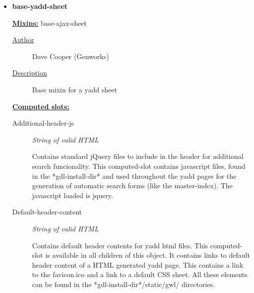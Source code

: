 \documentclass [11pt]{book}
\begin{document}
\begin{itemize}
\begin{description}
\end{description}







\item {}
\label{prim:base-yadd-sheet}
\textbf{base-yadd-sheet}


\textbf{
\underline{Mixins:}} base-ajax-sheet





\begin{description}

\item [
\underline{Author}]


Dave Cooper (Genworks)



\item [
\underline{Description}]


Base mixin for a yadd sheet



\end{description}








\textbf{
\underline{Computed slots:}}

\begin{description}

\item [Additional-header-js]
\emph{String of valid HTML}

 Contains standard jQuery files to include
in the header for additional search funcionality.  This computed-slot
contains javascript files, found in the *gdl-install-dir* and used
throughout the yadd pages for the generation of automatic search
forms (like the master-index).  The javascript loaded is jquery.




\item [Default-header-content]
\emph{String of valid HTML}

 Contains default header contents for yadd
html files.  This computed-slot is available in all children of this
object. It contains links to default header content of a HTML
generated yadd page. This contains a link to the favicon.ico and a
link to a default CSS sheet. All these elements can be found in the
*gdl-install-dir*/static/gwl/ directories.





\end{description}
\end{itemize}
\end{document}

